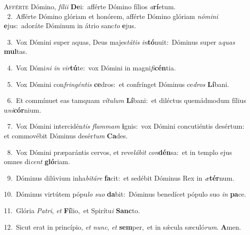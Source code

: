 \lettrine{\initial\textcolor{\initialcolor}{A}}{fférte} Dómino, \textit{fí}\-\textit{li}\textit{i} \textbf{De}\-i:~\star afférte Dómino fílios \textit{a}\-\textbf{rí}etum.\\
{\numbfont\textcolor{\numbcolor}{~2.}}~Afférte Dómino glóriam et honórem, afférte Dómino glóriam \textit{nó}\-\textit{mi}\textit{ni} \textbf{e}\-jus:~\star adoráte Dóminum in átrio sanc\textit{to} \textbf{e}\-jus.\par
{\numbfont\textcolor{\numbcolor}{~3.}}~Vox Dómini super aquas, Deus majes\-\textit{tá}\-\textit{tis} \textit{in}\-\textbf{tó}nuit:~\star Dóminus super a\textit{quas} \textbf{mul}\-tas.\par
{\numbfont\textcolor{\numbcolor}{~4.}}~Vox Dómi\textit{ni} \textit{in} \textit{vir}\-\textbf{tú}te:~\star vox Dómini in magni\-\textit{fi}\-\textbf{cén}tia.\par
{\numbfont\textcolor{\numbcolor}{~5.}}~Vox Dómini con\-\textit{frin}\-\textit{gén}\textit{tis} \textbf{ce}\-dros:~\star et confrínget Dóminus ce\textit{dros} \textbf{Lí}\-bani.\par
{\numbfont\textcolor{\numbcolor}{~6.}}~Et commínuet eas tamquam \textit{ví}\-\textit{tu}\textit{lum} \textbf{Lí}\-bani:~\star et diléctus quemádmodum fílius u\-\textit{ni}\-\textbf{cór}nium.\par
{\numbfont\textcolor{\numbcolor}{~7.}}~Vox Dómini intercidén\textit{tis} \textit{flam}\-\textit{mam} \textbf{i}\-gnis:~\star vox Dómini concutiéntis desértum: et commovébit Dóminus desér\textit{tum} \textbf{Ca}\-des.\par
{\numbfont\textcolor{\numbcolor}{~8.}}~Vox Dómini præparántis cervos, et reve\-\textit{lá}\-\textit{bit} \textit{con}\-\textbf{dén}sa:~\star et in templo ejus omnes di\textit{cent} \textbf{gló}\-riam.\par
{\numbfont\textcolor{\numbcolor}{~9.}}~Dóminus dilúvium inha\-\textit{bi}\-\textit{tá}\textit{re} \textbf{fa}\-cit:~\star et sedébit Dóminus Rex in \textit{æ}\-\textbf{tér}num.\par
{\numbfont\textcolor{\numbcolor}{10.}}~Dóminus virtútem pópu\textit{lo} \textit{su}\-\textit{o} \textbf{da}\-bit:~\star Dóminus benedícet pópulo suo \textit{in} \textbf{pa}\-ce.\par
{\numbfont\textcolor{\numbcolor}{11.}}~Glória \textit{Pa}\-\textit{tri}, \textit{et} \textbf{Fí}\-lio,~\star et Spirítu\textit{i} \textbf{Sanc}\-to.\par
{\numbfont\textcolor{\numbcolor}{12.}}~Sicut erat in princípio, \textit{et} \textit{nunc}\-, \textit{et} \textbf{sem}\-per,~\star et in sǽcula sæculó\-\textit{rum}\-. \textbf{A}\-men.\par
